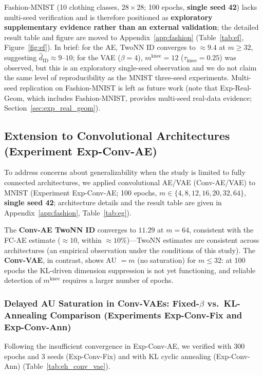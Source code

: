 \documentclass[make,article,submit,pdftex,moreauthors]{Definitions/mdpi}
\newcommand{\mknee}{m^{\mathrm{knee}}}
\begin{document}
Fashion-MNIST (10 clothing classes, $28\times28$; 100 epochs, \textbf{single seed 42})
lacks multi-seed verification and is therefore positioned as
\textbf{exploratory supplementary evidence rather than an external validation};
the detailed result table and figure are moved to Appendix~\ref{app:fashion}
(Table~\ref{tab:ef}, Figure~\ref{fig:ef}).
In brief: for the AE, TwoNN ID converges to $\approx 9.4$ at $m \geq 32$,
suggesting $\hat{d}_\mathrm{ID} \approx 9$--$10$;
for the VAE ($\beta = 4$), $\mknee = 12$ ($\tau_{\mathrm{knee}} = 0.25$) was
observed, but this is an exploratory single-seed observation and we do not claim
the same level of reproducibility as the MNIST three-seed experiments.
Multi-seed replication on Fashion-MNIST is left as future work
(note that Exp-Real-Geom, which includes Fashion-MNIST, provides multi-seed
real-data evidence; Section~\ref{sec:exp_real_geom}).

\subsection{Extension to Convolutional Architectures (Experiment Exp-Conv-AE)}\label{sec:exp_conv}

To address concerns about generalizability when the study is limited to fully connected architectures,
we applied convolutional AE/VAE (Conv-AE/VAE) to MNIST (Experiment Exp-Conv-AE;
100 epochs, $m \in \{4, 8, 12, 16, 20, 32, 64\}$, \textbf{single seed 42};
architecture details and the result table are given in Appendix~\ref{app:fashion},
Table~\ref{tab:eg}).

The \textbf{Conv-AE TwoNN ID} converges to $11.29$ at $m = 64$, consistent with the FC-AE
estimate ($\approx 10$, within $\approx 10\%$)---TwoNN estimates are consistent across
architectures (an empirical observation under the conditions of this study).
The \textbf{Conv-VAE}, in contrast, shows AU $= m$ (no saturation) for $m \leq 32$:
at 100 epochs the KL-driven dimension suppression is not yet functioning, and reliable
detection of $\mknee$ requires a larger number of epochs.

\subsubsection{Delayed AU Saturation in Conv-VAEs: Fixed-$\beta$ vs.\ KL-Annealing Comparison (Experiments Exp-Conv-Fix and Exp-Conv-Ann)}
\label{sec:exp_conv_300ep}

Following the insufficient convergence in Exp-Conv-AE, we verified with 300 epochs and 3 seeds (Exp-Conv-Fix)
and with KL cyclic annealing (Exp-Conv-Ann)
(Table~\ref{tab:eh_conv_vae}).
\end{document}
